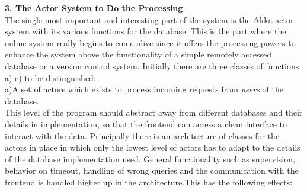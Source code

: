 \documentclass[twoside, 11pt]{scrartcl}
\begin{document}
\textbf{3. The Actor System to Do the Processing}\\	
The single most important and interesting part of the system is the Akka actor system with its various functions for the database. This is the part where the online system really begins to come alive since it offers the processing powers to enhance the system above the functionality of a simple remotely accessed database or a version control system. 
Initially there are three classes of functions a)-c) to be distinguished:\\

a)A set of actors which exists to process incoming requests from \textit{users} of the database. \\

This level of the  program should abstract away from different databases and their details in implementation, so that the frontend can access a clean interface to interact with the data.
Principally there is an architecture of classes for the actors in place in which only the lowest level of actors has to adapt to the details of the database implementation used. General functionality such as supervision, behavior on timeout, handling of wrong queries and the communication with the frontend is handled higher up in the architecture.This has the following effects:
\end{document}
